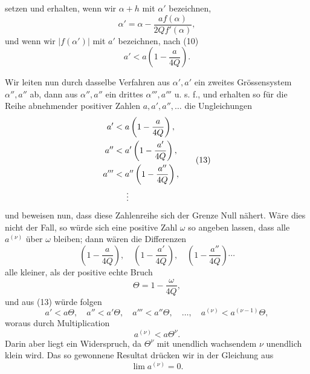 
setzen und erhalten, wenn wir $\alpha+h$ mit $\alpha'$ bezeichnen,
\begin{equation}
 \alpha'=\alpha-\frac{a f(\alpha)}{2Q f'(\alpha)},
\tag{11}
\end{equation}
und wenn wir $|f(\alpha')|$ mit $a'$ bezeichnen, nach (10)
\begin{equation}
 a'<a\left(1-\frac{a}{4Q}\right).
\tag{12}
\end{equation}

Wir leiten nun durch dasselbe Verfahren aus $\alpha',a'$ ein zweites Grössensystem $\alpha'',a''$ ab, dann aus $\alpha'',a''$ ein drittes $\alpha''',a'''$ u. s. f., und erhalten so für die Reihe abnehmender positiver Zahlen $a,a',a'',\ldots$ die Ungleichungen
\begin{equation}
\begin{aligned}
 a'&<a\left(1-\frac{a}{4Q}\right),\\
 a''&<a'\left(1-\frac{a'}{4Q}\right),\\
 a'''&<a''\left(1-\frac{a''}{4Q}\right),\\
 &\hspace{1.5em}\vdots
\end{aligned}
\tag{13}
\end{equation}
und beweisen nun, dass diese Zahlenreihe sich der Grenze Null nähert. Wäre dies nicht der Fall, so würde sich eine positive Zahl $\omega$ so angeben lassen, dass alle $a^{(\nu)}$ über $\omega$ bleiben; dann wären die Differenzen
\[
 \left(1-\frac{a}{4Q}\right),\quad
 \left(1-\frac{a'}{4Q}\right),\quad
 \left(1-\frac{a''}{4Q}\right)\cdots
\]
alle kleiner, als der positive echte Bruch
\[
 \Theta=1-\frac{\omega}{4Q},
\]
und aus (13) würde folgen
\[
 a'<a\Theta,\quad
 a''<a'\Theta,\quad
 a'''<a''\Theta,\quad
 \ldots,\quad
 a^{(\nu)}<a^{(\nu-1)}\Theta,
\]
woraus durch Multiplication
\begin{equation}
 a^{(\nu)}<a\Theta^\nu.
\tag{14}
\end{equation}
Darin aber liegt ein Widerspruch, da $\Theta^\nu$ mit unendlich wachsendem $\nu$ unendlich klein wird. Das so gewonnene Resultat drücken wir in der Gleichung aus
\begin{equation}
 \lim a^{(\nu)}=0.
\tag{15}
\end{equation}
